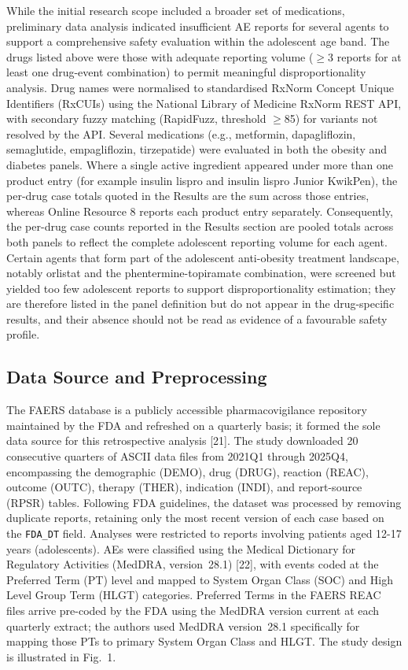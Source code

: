 \documentclass[10pt,a4paper]{article}
\begin{document}
While the initial research scope included a broader set of medications, preliminary data analysis indicated insufficient AE reports for several agents to support a comprehensive safety evaluation within the adolescent age band. The drugs listed above were those with adequate reporting volume ($\geq$3 reports for at least one drug-event combination) to permit meaningful disproportionality analysis. Drug names were normalised to standardised RxNorm Concept Unique Identifiers (RxCUIs) using the National Library of Medicine RxNorm REST API, with secondary fuzzy matching (RapidFuzz, threshold $\geq$85) for variants not resolved by the API. Several medications (e.g., metformin, dapagliflozin, semaglutide, empagliflozin, tirzepatide) were evaluated in both the obesity and diabetes panels. Where a single active ingredient appeared under more than one product entry (for example insulin lispro and insulin lispro Junior KwikPen), the per-drug case totals quoted in the Results are the sum across those entries, whereas Online Resource 8 reports each product entry separately. Consequently, the per-drug case counts reported in the Results section are pooled totals across both panels to reflect the complete adolescent reporting volume for each agent. Certain agents that form part of the adolescent anti-obesity treatment landscape, notably orlistat and the phentermine-topiramate combination, were screened but yielded too few adolescent reports to support disproportionality estimation; they are therefore listed in the panel definition but do not appear in the drug-specific results, and their absence should not be read as evidence of a favourable safety profile.

\subsection{Data Source and Preprocessing}
The FAERS database is a publicly accessible pharmacovigilance repository maintained by the FDA and refreshed on a quarterly basis; it formed the sole data source for this retrospective analysis [21]. The study downloaded 20 consecutive quarters of ASCII data files from 2021Q1 through 2025Q4, encompassing the demographic (DEMO), drug (DRUG), reaction (REAC), outcome (OUTC), therapy (THER), indication (INDI), and report-source (RPSR) tables. Following FDA guidelines, the dataset was processed by removing duplicate reports, retaining only the most recent version of each case based on the \texttt{FDA\_DT} field. Analyses were restricted to reports involving patients aged 12-17 years (adolescents). AEs were classified using the Medical Dictionary for Regulatory Activities (MedDRA, version~28.1) [22], with events coded at the Preferred Term (PT) level and mapped to System Organ Class (SOC) and High Level Group Term (HLGT) categories. Preferred Terms in the FAERS REAC files arrive pre-coded by the FDA using the MedDRA version current at each quarterly extract; the authors used MedDRA version~28.1 specifically for mapping those PTs to primary System Organ Class and HLGT. The study design is illustrated in Fig.~1.
\end{document}
